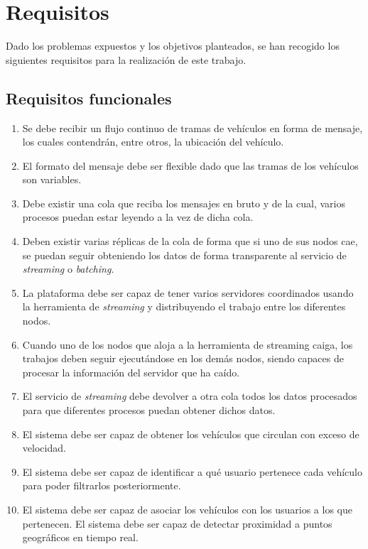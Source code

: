 
\chapter{Requisitos\label{requisitos}}

Dado los problemas expuestos y los objetivos planteados, se han recogido los siguientes requisitos para la realización de este trabajo.

\section{Requisitos funcionales\label{RF}}

\begin{enumerate}
\item Se debe recibir un flujo continuo de tramas de vehículos en forma de
  mensaje, los cuales contendrán, entre otros, la ubicación del vehículo.
\item El formato del mensaje debe ser flexible dado que las tramas de los
  vehículos son variables.
\item Debe existir una cola que reciba los mensajes en bruto y de la cual,
  varios procesos puedan estar leyendo a la vez de dicha cola.
\item Deben existir varias réplicas de la cola de forma que si uno de sus
  nodos cae, se puedan seguir obteniendo los datos de forma transparente al
  servicio de {\em streaming} o {\em batching}.
\item La plataforma debe ser capaz de tener varios servidores coordinados
  usando la herramienta de {\em streaming} y distribuyendo el trabajo entre
  los diferentes nodos.
\item Cuando uno de los nodos que aloja a la herramienta de streaming
  caiga, los trabajos deben seguir ejecutándose en los demás nodos, siendo
  capaces de procesar la información del servidor que ha caído.
\item El servicio de {\em streaming} debe devolver a otra cola todos los
  datos procesados para que diferentes procesos puedan obtener dichos
  datos.
\item El sistema debe ser capaz de obtener los vehículos que circulan con
  exceso de velocidad.
\item El sistema debe ser capaz de identificar a qué usuario pertenece cada
  vehículo para poder filtrarlos posteriormente.
\item El sistema debe ser capaz de asociar los vehículos con los usuarios a
  los que pertenecen. El sistema debe ser capaz de detectar proximidad a
  puntos geográficos en tiempo real.
\end{enumerate}

